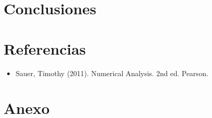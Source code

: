 \documentclass{article}
\newcommand{\python}[2]{
  \begin{itemize}
    \item[]
  \end{itemize}
}
\begin{document}
\section*{Conclusiones}

\lipsum[3]

\section*{Referencias}

  \begin{itemize}
    \item Sauer, Timothy (2011). Numerical Analysis. 2nd ed. Pearson.
  \end{itemize}

\section*{Anexo}

\end{document}

